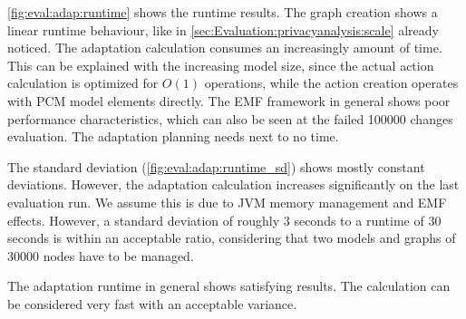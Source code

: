 \autoref{fig:eval:adap:runtime} shows the runtime results. The graph creation shows a linear runtime behaviour, like in \autoref{sec:Evaluation:privacyanalysis:scale} already noticed. The adaptation calculation consumes an increasingly amount of time. This can be explained with the increasing model size, since the actual action calculation is optimized for $O(1)$ operations, while the action creation operates with PCM model elements directly. The EMF framework in general shows poor performance characteristics, which can also be seen at the failed 100000 changes evaluation. The adaptation planning needs next to no time.

The standard deviation (\autoref{fig:eval:adap:runtime_sd}) shows mostly constant deviations. However, the adaptation calculation increases significantly on the last evaluation run. We assume this is due to JVM memory management and EMF effects. However, a standard deviation of roughly 3 seconds to a runtime of 30 seconds is within an acceptable ratio, considering that two models and graphs of 30000 nodes have to be managed.

The adaptation runtime in general shows satisfying results. The calculation can be considered very fast with an acceptable variance.





